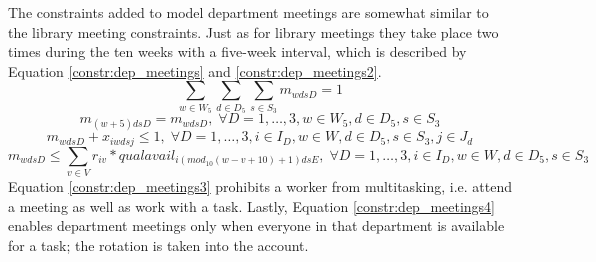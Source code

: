 The constraints added to model department meetings are somewhat similar to the library meeting constraints. Just as for library meetings they take place two times during the ten weeks with a five-week interval, which is described by Equation \ref{constr:dep_meetings} and \ref{constr:dep_meetings2}.
\begin{equation} \label{constr:dep_meetings}
\sum_{w \in W_5}\sum_{d \in D_5}\sum_{s \in S_3} m_{wdsD} = 1
\end{equation}
\begin{equation} \label{constr:dep_meetings2}
m_{(w+5)dsD} = m_{wdsD}, \; \forall D = 1, \ldots, 3, w \in W_5, d \in D_5, s \in S_3
\end{equation}
\begin{equation} \label{constr:dep_meetings3}
m_{wdsD} + x_{iwdsj} \leq 1, \; \forall D = 1, \ldots, 3, i \in I_D, w \in W, d \in D_5, s \in S_3, j \in J_d
\end{equation}
\begin{equation} \label{constr:dep_meetings4}
m_{wdsD} \leq \sum_{v \in V} r_{iv}*qualavail_{i(mod_{10}(w-v+10)+1)dsE}, \; \forall D = 1, \ldots, 3, i \in I_D, w \in W, d \in D_5, s \in S_3
\end{equation}
Equation \ref{constr:dep_meetings3} prohibits a worker from multitasking, i.e. attend a meeting as well as work with a task. Lastly, Equation \ref{constr:dep_meetings4} enables department meetings only when everyone in that department is available for a task; the rotation is taken into the account.

